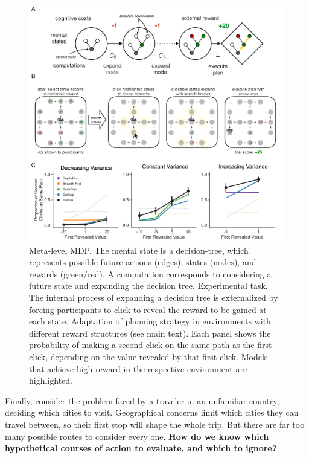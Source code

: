 \documentclass[dsingle]{memo}
\begin{document}
\begin{figure}[ph]
  \centering
  \includegraphics[width=\textwidth]{diagrams/precis/planning.pdf}
  \caption{
     Meta-level MDP. The mental state is a decision-tree, which represents possible future actions (edges), states (nodes), and rewards (green/red). A computation corresponds to considering a future state and expanding the decision tree.
     Experimental task. The internal process of expanding a decision tree is externalized by forcing participants to click to reveal the reward to be gained at each state.
     Adaptation of planning strategy in environments with different reward structures (see main text). Each panel shows the probability of making a second click on the same path as the first click, depending on the value revealed by that first click. Models that achieve high reward in the respective environment are highlighted. %
  }
  \label{fig:planning}
\end{figure}


Finally, consider the problem faced by a traveler in an unfamiliar country, deciding which cities to visit. Geographical concerns limit which cities they can travel between, so their first stop will shape the whole trip. But there are far too many possible routes to consider every one. \textbf{How do we know which hypothetical courses of action to evaluate, and which to ignore?}
\end{document}
